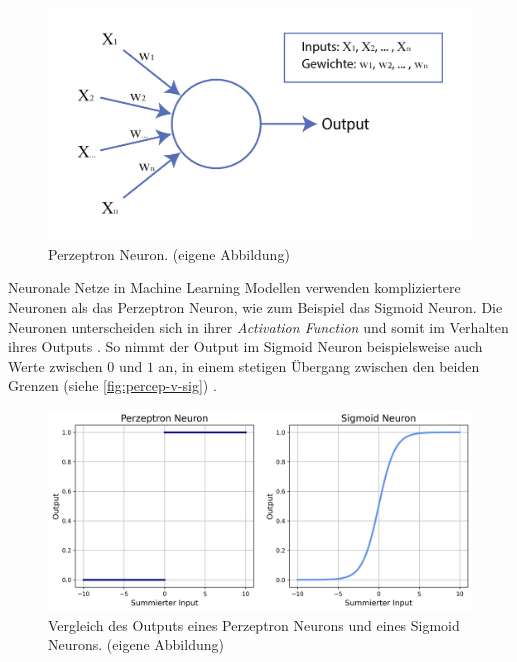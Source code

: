 \begin{figure}[!ht]
   \centering
   \includegraphics[width=\textwidth]{images/theorie/neuron.png}
   \caption{Perzeptron Neuron. (eigene Abbildung)}\label{fig:neuron}
\end{figure}
 
Neuronale Netze in Machine Learning Modellen verwenden kompliziertere Neuronen
als das Perzeptron Neuron, wie zum Beispiel das Sigmoid Neuron. Die Neuronen
unterscheiden sich in ihrer \emph{Activation Function} und somit im Verhalten ihres
Outputs \cite{pragati_activation_2022}. So nimmt der Output im Sigmoid Neuron
beispielsweise auch Werte zwischen $0$ und $1$ an, in einem stetigen Übergang
zwischen den beiden Grenzen (siehe \autoref{fig:percep-v-sig}) \cite{kumar_sigmoid_2019}.

\newpage
\begin{figure}[!ht]
   \centering
   \includegraphics[width=\textwidth]{images/theorie/percep-v-sig.png}
   \caption{Vergleich des Outputs eines Perzeptron Neurons und eines Sigmoid Neurons. (eigene Abbildung)}\label{fig:percep-v-sig}
\end{figure}

